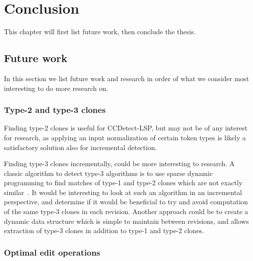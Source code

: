 \chapter{Conclusion}

This chapter will first list future work, then conclude the thesis.

\section{Future work}

In this section we list future work and research in order of what we consider most
interesting to do more research on.

\subsection*{Type-2 and type-3 clones}

Finding type-2 clones is useful for CCDetect-LSP, but may not be of any interest for
research, as applying an input normalization of certain token types is likely a
satisfactory solution also for incremental detection.

Finding type-3 clones incrementally, could be more interesting to research. A classic
algorithm to detect type-3 algorithms is to use sparse dynamic programming to find matches
of type-1 and type-2 clones which are not exactly
similar~\cite{BakerSparseDynamicProgramming}. It would be interesting to look at such an
algorithm in an incremental perspective, and determine if it would be beneficial to try
and avoid computation of the same type-3 clones in each revision. Another approach could
be to create a dynamic data structure which is simple to maintain between revisions, and
allows extraction of type-3 clones in addition to type-1 and type-2 clones. 


\subsection*{Optimal edit operations}

